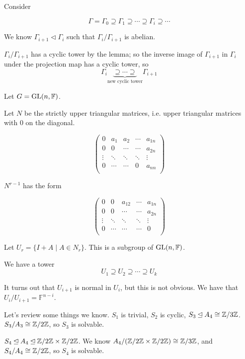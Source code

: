 \documentclass[x11names,reqno,14pt]{extarticle}
\begin{document}
Consider

\[
\Gamma = \Gamma_0 \supseteq \Gamma_1\supseteq \cdots\supseteq \Gamma_i\supseteq \cdots
\]

We know $\Gamma_{i + 1}\lhd \Gamma_i$ such that $\Gamma_i/\Gamma_{i + 1}$ is abelian. 

$\Gamma_i/\Gamma_{i + 1}$ has a cyclic tower by the lemma; so the inverse image of $\Gamma_{i + 1}$ in $\Gamma_i$ under the projection map has a cyclic tower, so 
\[
\Gamma_i\underbrace{\supseteq\cdots\supseteq}_{\text{new cyclic tower}}\Gamma_{i + 1}
\]

\exm

Let $G = {\mathrm{GL}}(n, \mathbb{F})$. 

Let $N$ be the strictly upper triangular matrices, i.e. upper triangular matrices with 0 on the diagonal. 

\[
\begin{pmatrix} 0 & a_1 & a_2 & \cdots & a_{1n} \\
					 0 & 0 & \cdots & \cdots & a_{2n} \\
					\vdots & \ddots & \ddots & \ddots & \vdots \\
					0 & \cdots & \cdots & 0 & a_{nn} \\
\end{pmatrix}
\]

$N^{r - 1}$ has the form 

\[
\begin{pmatrix} 0 & 0 & a_{12} & \cdots & a_{1n} \\
					 0 & 0 & \cdots & \cdots & a_{2n} \\
					\vdots & \ddots & \ddots & \ddots & \vdots \\
					0 & \cdots & \cdots & \cdots &0 \\
\end{pmatrix}
\]

Let $U_r = \{I + A \mid A \in N_r\}$. This is a subgroup of ${\mathrm{GL}}(n, \mathbb{F})$. 

We have a tower
\[
U_1\supseteq U_2 \supseteq \cdots \supseteq U_k
\]

It turns out that $U_{i + 1}$ is normal in $U_i$, but this is not obvious. We have that $U_i/U_{i + 1} = \mathbb{F}^{n - i}$. 

Let's review some things we know. $S_1$ is trivial, $S_2$ is cyclic, $S_3\unlhd A_4 \cong \mathbb{Z}/3\mathbb{Z}$. $S_3 /A_3 \cong \mathbb{Z}/2\mathbb{Z}$, so $S_3$ is solvable. 

$S_4 \unlhd A_4 \unlhd \mathbb{Z}/2\mathbb{Z} \times \mathbb{Z}/2\mathbb{Z}$. We know $A_4 /(\mathbb{Z}/2\mathbb{Z}\times\mathbb{Z}/2\mathbb{Z}) \cong \mathbb{Z}/3\mathbb{Z}$, and $S_4/A_4 \cong \mathbb{Z}/2\mathbb{Z}$, so $S_4$ is solvable. 
\end{document}
